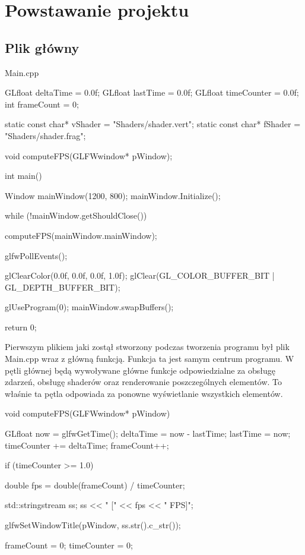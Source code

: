 \documentclass[a4paper,12pt]{article}
\numberwithin{equation}{section}
\begin{document}
\section{Powstawanie projektu}

\subsection{Plik główny}

\begin{center}
    Main.cpp
\end{center}

\begin{cppcode}
GLfloat deltaTime = 0.0f;
GLfloat lastTime = 0.0f;
GLfloat timeCounter = 0.0f;
int frameCount = 0;

static const char* vShader = "Shaders/shader.vert";
static const char* fShader = "Shaders/shader.frag";

void computeFPS(GLFWwindow* pWindow);

int main()
{
	Window mainWindow(1200, 800);
	mainWindow.Initialize();

	while (!mainWindow.getShouldClose())
	{
		computeFPS(mainWindow.mainWindow);

		glfwPollEvents();

		glClearColor(0.0f, 0.0f, 0.0f, 1.0f);
		glClear(GL_COLOR_BUFFER_BIT | GL_DEPTH_BUFFER_BIT);

		glUseProgram(0);
		mainWindow.swapBuffers();
	}

	return 0;
}
\end{cppcode}

Pierwszym plikiem jaki zostął stworzony podczas tworzenia programu był plik Main.cpp wraz z główną funkcją. Funkcja ta jest samym centrum programu. W pętli głównej będą wywoływane główne funkcje odpowiedzialne za obsługę zdarzeń, obsługę shaderów oraz renderowanie poszczególnych elementów.
To właśnie ta pętla odpowiada za ponowne wyświetlanie wszystkich elementów.

\begin{cppcode}

void computeFPS(GLFWwindow* pWindow)
{
	GLfloat now = glfwGetTime();
	deltaTime = now - lastTime;
	lastTime = now;
	timeCounter += deltaTime;
	frameCount++;

	if (timeCounter >= 1.0) {
		double fps = double(frameCount) / timeCounter;

		std::stringstream ss;
		ss << " [" << fps << " FPS]";

		glfwSetWindowTitle(pWindow, ss.str().c_str());

		frameCount = 0;
		timeCounter = 0;
	}
}
\end{cppcode}
\end{document}
